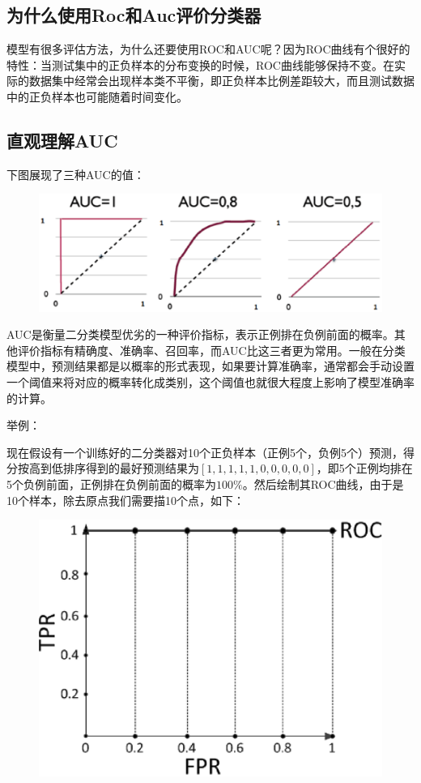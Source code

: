\subsection{为什么使用Roc和Auc评价分类器}

模型有很多评估方法，为什么还要使用ROC和AUC呢？因为ROC曲线有个很好的特性：当测试集中的正负样本的分布变换的时候，ROC曲线能够保持不变。在实际的数据集中经常会出现样本类不平衡，即正负样本比例差距较大，而且测试数据中的正负样本也可能随着时间变化。

\subsection{直观理解AUC}

下图展现了三种AUC的值：

 \begin{figure}[h]
   \centering
   \includegraphics[width=.7\textwidth]{imgs/2.40.15.1.eps}
 \end{figure}

AUC是衡量二分类模型优劣的一种评价指标，表示正例排在负例前面的概率。其他评价指标有精确度、准确率、召回率，而AUC比这三者更为常用。一般在分类模型中，预测结果都是以概率的形式表现，如果要计算准确率，通常都会手动设置一个阈值来将对应的概率转化成类别，这个阈值也就很大程度上影响了模型准确率的计算。

举例：

现在假设有一个训练好的二分类器对10个正负样本（正例5个，负例5个）预测，得分按高到低排序得到的最好预测结果为$[1, 1, 1, 1, 1, 0, 0, 0, 0, 0]$，即5个正例均排在5个负例前面，正例排在负例前面的概率为$100\%$。然后绘制其ROC曲线，由于是10个样本，除去原点我们需要描10个点，如下：

 \begin{figure}[h]
   \centering
   \includegraphics[width=.7\textwidth]{imgs/2.16.17-1.eps}
 \end{figure}

